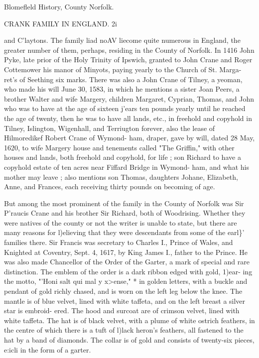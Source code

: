 \documentclass{book}
\begin{document}
Blomefleld History, County Norfolk. 



CRANK FAMILY IN ENGLAND. 2i 

and C'laytons. The family liad noAV liecome quite numerous in 
England, the greater number of them, perhaps, residing in the 
County of Norfolk. In 1416 John Pyke, late prior of the Holy 
Trinity of Ipswich, granted to John Crane and Roger Cottemower 
his manor of Minyots, paying yearly to the Church of St. Marga- 
ret's of Seething six marks. There was also a John Crane of 
Tilney, a yeoman, who made his will June 30, 1583, in which he 
mentions a sister Joan Peers, a brother Walter and wife Margery, 
children Margaret, Cyprian, Thomas, and John who was to have 
at the age of sixteen j'ears ten pounds yearly until he reached 
the age of twenty, then he was to have all lands, etc., in freehold 
and copyhold in Tilney, Islington, Wigenhall, and Terriugton 
forever, also the lease of Hilmoredikef Robert Crane of Wymond- 
ham, draper, gave by will, dated 28 May, 1620, to wife Margery 
house and tenements called "The Griffin," with other houses and 
lands, both freehold and copyhold, for life ; son Richard to have 
a copyhold estate of ten acres near Fiffard Bridge in Wymond- 
ham, and what his mother may leave ; also mentions son Thomas, 
daughters Johane, Elizabeth, Anne, and Frances, each receiving 
thirty pounds on becoming of age. 

But among the most prominent of the family in the County of 
Norfolk was Sir P'raucis Crane and his brother Sir Richard, both 
of Woodrising. Whether they were natives of the county or not 
the writer is unable to state, but there are many reasons for 
l)elieving that they were descendants from some of the earl\}' 
families there. Sir Francis was secretary to Charles I., Prince 
of Wales, and Knighted at Coventry, Sept. 4, 1617, by King 
James I., father to the Prince. He was also made Chancellor of 
the Order of the Garter, a mark of special and rare distinction. 
The emblem of the order is a dark ribbon edged with gold, 1)ear- 
ing the motto, "'Honi salt qui mal y x>ense," * in golden letters, 
with a buckle and pendant of gold richly chased, and is worn on 
the left leg below the knee. The mantle is of blue velvet, lined 
with white taffeta, and on the left breast a silver star is embroid- 
ered. The hood and surcoat are of crimson velvet, lined with 
white taffeta. The hat is of black velvet, with a plume of white 
ostrich feathers, in the centre of which there is a tuft of l)lack 
heron's feathers, all fastened to the hat by a band of diamonds. 
The collar is of gold and consists of twenty-six pieces, e:icli in 
the form of a garter. 
\end{document}
